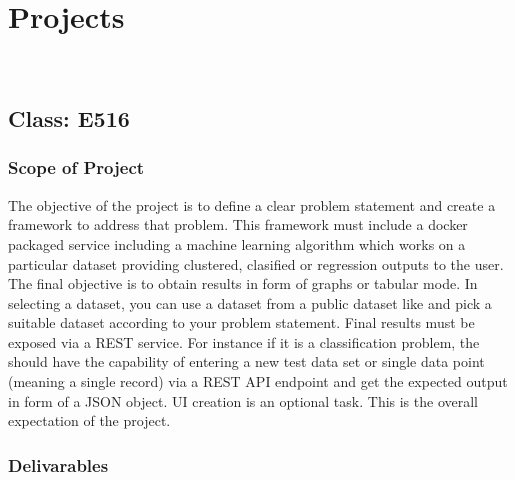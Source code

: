 \chapter{Projects}
\label{c:projects}
\FILENAME\

\section{Class: E516}\label{s:e516-project}

\subsection{Scope of Project}

The objective of the project is to define a clear problem statement
and create a framework to address that problem. This framework must
include a docker packaged service including a machine learning
algorithm which works on a particular dataset providing clustered,
clasified or regression outputs to the user. The final objective is to
obtain results in form of graphs or tabular mode. In selecting a
dataset, you can use a dataset from a public dataset like
 and pick a suitable
dataset according to your problem statement. Final results must be
exposed via a REST service. For instance if it is a classification
problem, the should have the capability of entering a new test data
set or single data point (meaning a single record) via a REST API endpoint
and get the expected output in form of a JSON object. UI creation is an
optional task. This is the overall expectation of the project. 

\subsection{Delivarables}

